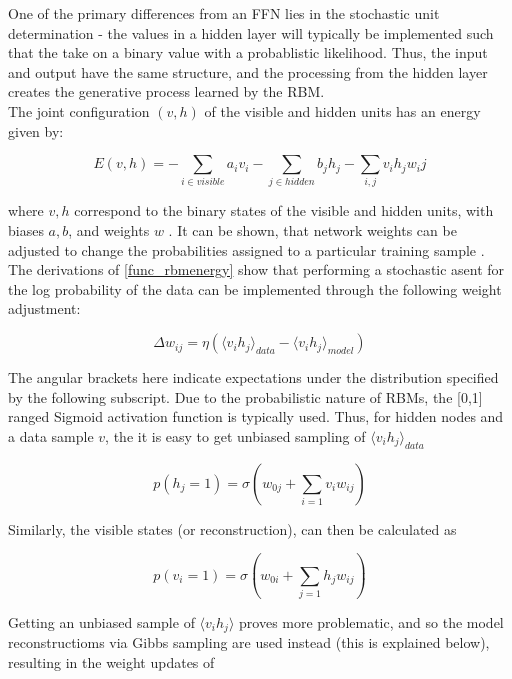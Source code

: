 \documentclass[a4paper,latin]{paper}
\begin{document}
One of the primary differences from an FFN lies in the stochastic unit determination - the values in a hidden layer will typically be implemented such that the take on a binary value with a probablistic likelihood. Thus, the input and output have the same structure, and the processing from the hidden layer creates the generative process learned by the RBM. 
~\\
The joint configuration $(v,h)$ of the visible and hidden units has an energy given by:

\begin{equation}\label{func_rbmenergy}
E(v,h) = - \sum_{i \in visible} a_iv_i - \sum_{j \in hidden} b_jh_j - \sum_{i,j}v_ih_jw_ij
\end{equation}

where $v,h$ correspond to the binary states of the visible and hidden units, with biases $a,b$, and weights $w$ \cite{Hinton5}. It can be shown, that network weights can be adjusted to change the probabilities assigned to a particular training sample \cite{Hinton5}. The derivations of \ref{func_rbmenergy} show that performing a stochastic asent for the log probability of the data can be implemented through the following weight adjustment:

\begin{equation}
\Delta w_{ij} = \eta (\langle v_ih_j\rangle_{data} - \langle v_ih_j\rangle_{model})
\end{equation}

The angular brackets here indicate expectations under the distribution specified by the following subscript. Due to the probabilistic nature of RBMs, the [0,1] ranged Sigmoid activation function is typically used. Thus, for hidden nodes and a data sample $v$, the it is easy to get unbiased sampling of $\langle v_ih_j \rangle_{data}$

\begin{equation}
p(h_j=1) = \sigma(w_{0j} +  \sum_{i=1}v_iw_{ij})
\end{equation}

Similarly, the visible states (or reconstruction), can then be calculated as 

\begin{equation}
p(v_i=1) = \sigma(w_{0i} + \sum_{j=1}h_jw_{ij})
\end{equation}


Getting an unbiased sample of $\langle v_i h_j \rangle$ proves more problematic, and so the model reconstructioms via Gibbs sampling are used instead (this is explained below), resulting in the weight updates of
\end{document}
